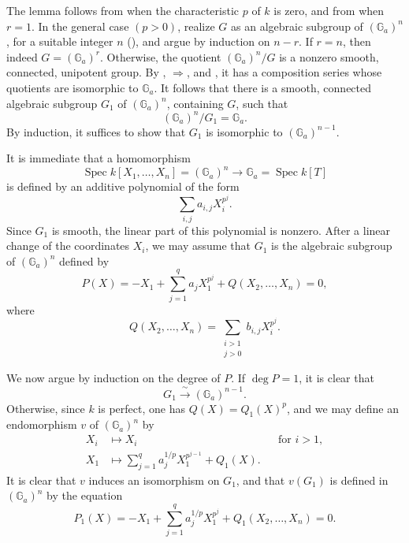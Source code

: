 
The lemma follows from  when the characteristic \(p\) of
\(k\) is zero, and from  when \(r=1\).  In the general case
\((p>0)\), realize \(G\) as an algebraic subgroup of
\((\mathbb G_a)^n\), for a suitable integer \(n\) (), and
argue by induction on \(n-r\).  If \(r=n\), then indeed
\(G=(\mathbb G_a)^r\).  Otherwise, the quotient
\((\mathbb G_a)^n/G\) is a nonzero smooth, connected, unipotent
group.  By , \(\Rightarrow\), and , it has a
composition series whose quotients are isomorphic to
\(\mathbb G_a\).  It follows that there is a smooth, connected
algebraic subgroup \(G_1\) of \((\mathbb G_a)^n\), containing \(G\),
such that
\[
  (\mathbb G_a)^n/G_1=\mathbb G_a.
\]
By induction, it suffices to show that \(G_1\) is isomorphic to
\((\mathbb G_a)^{n-1}\).

It is immediate that a homomorphism
\[
  \operatorname{Spec}k[X_1,\ldots,X_n]=(\mathbb G_a)^n
  \longrightarrow
  \mathbb G_a=\operatorname{Spec}k[T]
\]
is defined by an additive polynomial of the form
\[
  \sum_{i,j}a_{i,j}X_i^{p^j}.
\]
Since \(G_1\) is smooth, the linear part of this polynomial is
nonzero.  After a linear change of the coordinates \(X_i\), we may
assume that \(G_1\) is the algebraic subgroup of
\((\mathbb G_a)^n\) defined by
\[
  \tag{\(*\)}
  P(X)=-X_1+\sum_{j=1}^{q}a_jX_1^{p^j}
    +Q(X_2,\ldots,X_n)=0,
\]
where
\[
  Q(X_2,\ldots,X_n)
    =\sum_{\substack{i>1\\j>0}}b_{i,j}X_i^{p^j}.
\]

We now argue by induction on the degree of \(P\).  If
\(\deg P=1\), it is clear that
\[
  G_1\xrightarrow{\ \sim\ }(\mathbb G_a)^{n-1}.
\]
Otherwise, since \(k\) is perfect, one has
\(Q(X)=Q_1(X)^p\), and we may define an endomorphism \(v\) of
\((\mathbb G_a)^n\) by
\[
\begin{aligned}
  X_i&\longmapsto X_i &&\text{for \(i>1\)},\\
  X_1&\longmapsto
    \sum_{j=1}^{q}a_j^{1/p}X_1^{p^{j-1}}+Q_1(X).
\end{aligned}
\]
It is clear that \(v\) induces an isomorphism on \(G_1\), and that
\(v(G_1)\) is defined in \((\mathbb G_a)^n\) by the equation
\[
  \tag{\(*\)\(_1\)}
  P_1(X)=-X_1+\sum_{j=1}^{q}a_j^{1/p}X_1^{p^j}
    +Q_1(X_2,\ldots,X_n)=0.
\]
